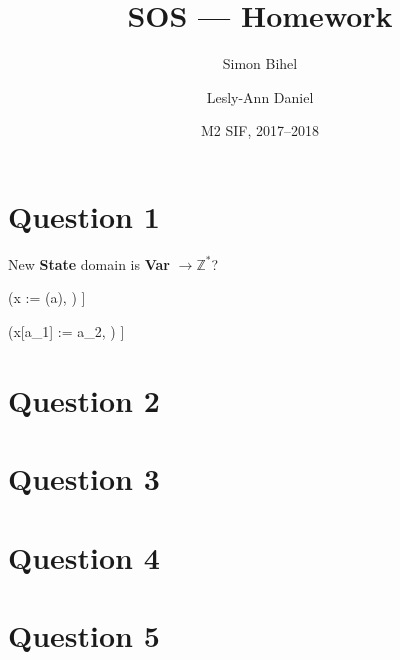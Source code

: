 \documentclass{article}
\title{SOS --- Homework}
\author{Simon Bihel \and Lesly-Ann Daniel}
\date{M2 SIF, 2017--2018}
\begin{document}
\maketitle

\section*{Question 1}

New \textbf{State} domain is \textbf{Var} $\rightarrow \mathds{Z}^*$?



    {(x :=  (a), \sigma) \rightarrow
     \sigma[x \mapsto \mathcal{B}\llbracket [i : \text{Undefined}, \forall i \in 0..a] \rrbracket]}

    {(x[a_1] := a_2, \sigma) \rightarrow
     \sigma[x \mapsto \mathcal{A}\llbracket x[a_1 : a_2] \rrbracket \sigma]}


\section*{Question 2}

\section*{Question 3}

\section*{Question 4}

\section*{Question 5}
\end{document}
